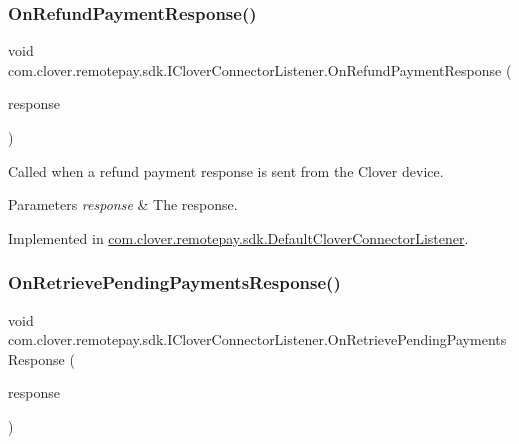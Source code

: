 \subsubsection{\texorpdfstring{On\+Refund\+Payment\+Response()}{OnRefundPaymentResponse()}}
{\footnotesize\ttfamily void com.\+clover.\+remotepay.\+sdk.\+I\+Clover\+Connector\+Listener.\+On\+Refund\+Payment\+Response (\begin{DoxyParamCaption}\item[{\hyperlink{classcom_1_1clover_1_1remotepay_1_1sdk_1_1_refund_payment_response}{Refund\+Payment\+Response}}]{response }\end{DoxyParamCaption})}



Called when a refund payment response is sent from the Clover device. 


\begin{DoxyParams}{Parameters}
{\em response} & The response.\\
\hline
\end{DoxyParams}


Implemented in \hyperlink{classcom_1_1clover_1_1remotepay_1_1sdk_1_1_default_clover_connector_listener_a9129ed4160946b687461c962c7af8e93}{com.\+clover.\+remotepay.\+sdk.\+Default\+Clover\+Connector\+Listener}.

\mbox{\label{interfacecom_1_1clover_1_1remotepay_1_1sdk_1_1_i_clover_connector_listener_a3567d50af6c179c41d0a47eaf4e5127b}} 
\subsubsection{\texorpdfstring{On\+Retrieve\+Pending\+Payments\+Response()}{OnRetrievePendingPaymentsResponse()}}
{\footnotesize\ttfamily void com.\+clover.\+remotepay.\+sdk.\+I\+Clover\+Connector\+Listener.\+On\+Retrieve\+Pending\+Payments\+Response (\begin{DoxyParamCaption}\item[{\hyperlink{classcom_1_1clover_1_1remotepay_1_1sdk_1_1_retrieve_pending_payments_response}{Retrieve\+Pending\+Payments\+Response}}]{response }\end{DoxyParamCaption})}



